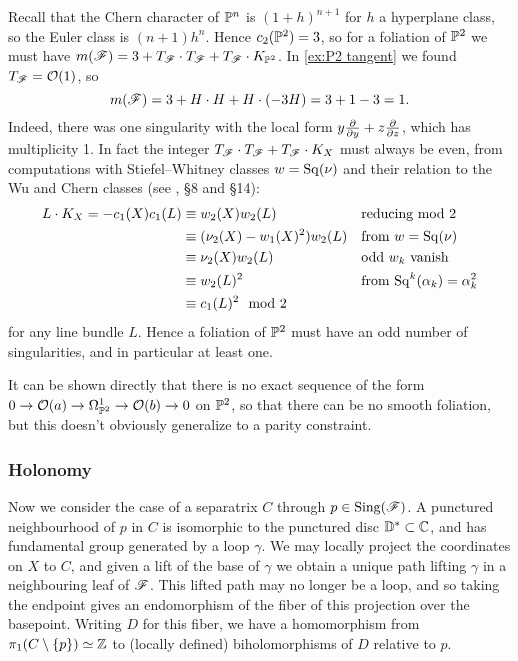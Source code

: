 \begin{example}
    Recall that the Chern character of $\P^n$ is $(1+h)^{n+1}$ for $h$ a
    hyperplane class, so the Euler class is $(n+1)h^n$. Hence $c_2(\P^2)=3$, so
    for a foliation of $\P^2$ we must have
    $m(\scrF)=3+T_\scrF\cdot T_\scrF+T_\scrF\cdot K_{\P^2}$. In
    \cref{ex:P2 tangent} we found $T_\scrF=\O(1)$, so
    \begin{equation*}
        m(\scrF) = 3 + H\cdot H + H\cdot(-3H) = 3 + 1 - 3 = 1.
    \end{equation*}
    Indeed, there was one singularity with the local form
    $y\pdv{}{y}+z\pdv{}{z}$, which has multiplicity 1. In fact the integer
    $T_\scrF\cdot T_\scrF+T_\scrF\cdot K_X$ must always be even, from
    computations with Stiefel--Whitney classes $w=\Sq(\nu)$ and their relation
    to the Wu and Chern classes (see \cite{milnor_book}, \S8 and \S14):
    \begin{align*}
        L\cdot K_X
            = -c_1(X)c_1(L)
            &\equiv w_2(X)w_2(L)
            & &\text{reducing mod 2} \\
            &\equiv (\nu_2(X)-w_1(X)^2)w_2(L)
            & &\text{from $w=\Sq(\nu)$} \\
            &\equiv \nu_2(X)w_2(L)
            & &\text{odd $w_k$ vanish} \\
            &\equiv w_2(L)^2 
            & &\text{from $\Sq^k(\alpha_k)=\alpha_k^2$} \\
            &\equiv c_1(L)^2 \mod2
    \end{align*}
    for any line bundle $L$. Hence a foliation of $\P^2$ must have an odd number
    of singularities, and in particular at least one.
\end{example}

\begin{remark}
    It can be shown directly that there is no exact sequence of the form
    $0\to\O(a)\to\Omega^1_{\P^2}\to\O(b)\to0$ on $\P^2$, so that there can be no
    smooth foliation, but this doesn't obviously generalize to a parity
    constraint.
\end{remark}

\subsubsection{Holonomy}

Now we consider the case of a separatrix $C$ through $p\in\Sing(\scrF)$. A
punctured neighbourhood of $p$ in $C$ is isomorphic to the punctured disc
$\D^*\subset\C$, and has fundamental group generated by a loop $\gamma$. We may
locally project the coordinates on $X$ to $C$, and given a lift of the base of
$\gamma$ we obtain a unique path lifting $\gamma$ in a neighbouring leaf of
$\scrF$. This lifted path may no longer be a loop, and so taking the endpoint
gives an endomorphism of the fiber of this projection over the basepoint.
Writing $D$ for this fiber, we have a homomorphism from
$\pi_1(C\setminus\{p\})\simeq\Z$ to (locally defined) biholomorphisms of $D$
relative to $p$.

